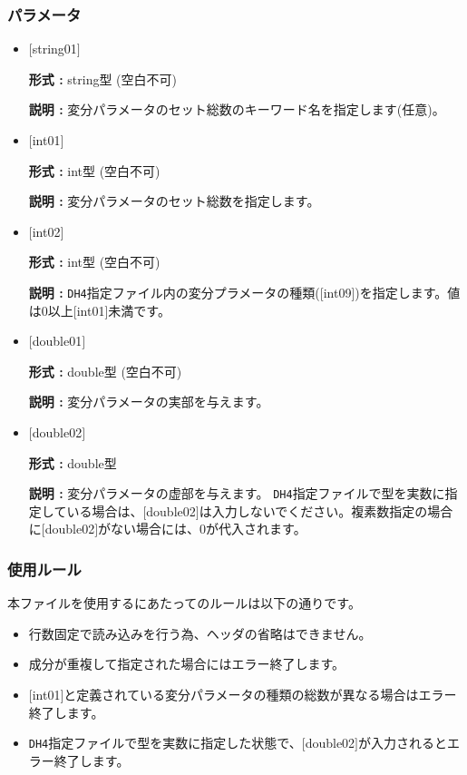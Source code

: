 \subsubsection{パラメータ}
 \begin{itemize}

   \item  $[$string01$]$
   
    {\bf 形式 :} string型 (空白不可)

   {\bf 説明 :} 変分パラメータのセット総数のキーワード名を指定します(任意)。

   \item  $[$int01$]$
   
    {\bf 形式 :} int型 (空白不可)

   {\bf 説明 :} 変分パラメータのセット総数を指定します。

 \item  $[$int02$]$
   
   {\bf 形式 :} int型 (空白不可)

  {\bf 説明 :} \verb|DH4|指定ファイル内の変分プラメータの種類([int09])を指定します。値は0以上[int01]{未満}です。

 \item  $[$double01$]$
    
   {\bf 形式 :} double型 (空白不可)

  {\bf 説明 :} 変分パラメータの実部を与えます。
  
 
 \item $[$double02$]$
   
   {\bf 形式 :} double型

  {\bf 説明 :} 変分パラメータの虚部を与えます。 \verb|DH4|指定ファイルで型を実数に指定している場合は、$[$double02$]$は入力しないでください。複素数指定の場合に$[$double02$]$がない場合には、0が代入されます。
  
\end{itemize}

\subsubsection{使用ルール}
本ファイルを使用するにあたってのルールは以下の通りです。
\begin{itemize}
\item 行数固定で読み込みを行う為、ヘッダの省略はできません。
\item 成分が重複して指定された場合にはエラー終了します。
\item $[$int01$]$と定義されている変分パラメータの種類の総数が異なる場合はエラー終了します。
\item \verb|DH4|指定ファイルで型を実数に指定した状態で、$[$double02$]$が入力されるとエラー終了します。

\end{itemize}

